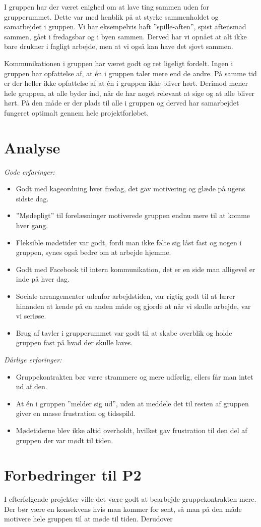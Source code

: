 I gruppen har der været enighed om at lave ting sammen uden for grupperummet. Dette var med henblik på at styrke sammenholdet og samarbejdet i gruppen. Vi har eksempelvis haft ”spille-aften”, spist aftensmad sammen, gået i fredagsbar og i byen sammen. Derved har vi opnået at alt ikke bare drukner i fagligt arbejde, men at vi også kan have det sjovt sammen.

Kommunikationen i gruppen har været godt og ret ligeligt fordelt. Ingen i gruppen har opfattelse af, at én i gruppen taler mere end de andre. På samme tid er der heller ikke opfattelse af at én i gruppen ikke bliver hørt. Derimod mener hele gruppen, at alle byder ind, når de har noget relevant at sige og at alle bliver hørt. På den måde er der plads til alle i gruppen og derved har samarbejdet fungeret optimalt gennem hele projektforløbet.

\section{Analyse}

\emph{Gode erfaringer:}
\begin{itemize}
\item	Godt med kageordning hver fredag, det gav motivering og glæde på ugens sidste dag. 

\item	”Mødepligt” til forelæsninger motiverede gruppen endnu mere til at komme hver gang. 

\item	Fleksible mødetider var godt, fordi man ikke følte sig låst fast og nogen i gruppen, synes også bedre om at arbejde hjemme.  

\item	Godt med Facebook til intern kommunikation, det er en side man alligevel er inde på hver dag.

\item	Sociale arrangementer udenfor arbejdstiden, var rigtig godt til at lærer hinanden at kende på en anden måde og gjorde at når vi skulle arbejde, var vi seriøse. 

\item	 Brug af tavler i grupperummet var godt til at skabe overblik og holde gruppen fast på hvad der skulle laves. 
\end{itemize}\emph{Dårlige erfaringer:}
\begin{itemize}
\item	Gruppekontrakten bør være strammere og mere udførlig, ellers får man intet ud af den.

\item	 At én i gruppen ”melder sig ud”, uden at meddele det til resten af gruppen giver en masse frustration og tidsspild.

\item	Mødetiderne blev ikke altid overholdt, hvilket gav frustration til den del af gruppen der var mødt til tiden.
\end{itemize}

\section{Forbedringer til P2}

I efterfølgende projekter ville det være godt at bearbejde gruppekontrakten mere. Der bør være en konsekvens hvis man kommer for sent, så man på den måde motivere hele gruppen til at møde til tiden. Derudover 
